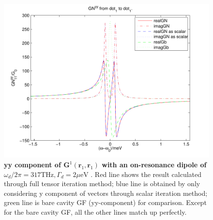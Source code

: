 \begin{figure}[H]
\centering
\begin{center}
\includegraphics[width=14cm]{./Figs/G84_yy11_1}
\end{center}
\caption[yy component of $G^1(\mathbf{r}_1,\mathbf{r}_1)$ with an on-resonance dipole.]{\textbf{  yy component of $\mathbf{G}^1(\mathbf{r}_1,\mathbf{r}_1)$ with an on-resonance dipole of $\omega_d/2\pi = 317 {\text {THz}}, \Gamma_d = 2 \mu{\text {eV}}$ }. Red line shows the result calculated through full tensor iteration method; blue line is obtained by only considering y component of vectors through scalar iteration method; green line is bare cavity GF (yy-component) for comparison. Except for the bare cavity GF, all the other lines match up perfectly.}
\label{G84_yy11_1}
\end{figure}

